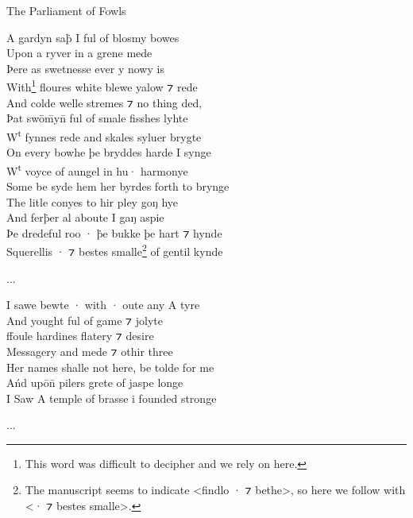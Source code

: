 \begin{texts}{The Parliament of Fowls}
\begin{textglossed}
A gardyn sa\.{þ} I ful of blosmy bowes\\
Upon a ryver in a grene mede\\
Þere as swetnesse ever y nowy is\\
With\footnote{This word was difficult to decipher and we rely on \citet[386--390]{Benson1991} here.} floures white blewe yalow ⁊ rede\\
And colde welle stremes ⁊ no thing ded,\\
Þat swōm̄yn̄ ful of smale fisshes lyhte\\
W\textsuperscript{t} fynnes rede and skales syluer brygte\\
On every bowhe þe bryddes harde I synge\\
W\textsuperscript{t} voyce of aungel in hu· harmonye\\
Some be syde hem her byrdes forth to brynge\\
The litle conyes to hir pley goŋ hye\\
And fer\.{þ}er al aboute I gaŋ aspie\\
Þe dredeful roo · \.{þ}e bukke þe hart ⁊ hynde\\
Squerellis · ⁊ bestes smalle\footnote{The manuscript seems to indicate <findlo · ⁊ bethe>, so here we follow \citet[388]{Benson1991} with <· ⁊ bestes smalle>.} of gentil kynde

...

I sawe bewte · with · oute any A tyre\\
And yought ful of game ⁊ jolyte\\
ffoule hardines flatery ⁊ desire\\
Messagery and mede ⁊ othir three\\
Her names shalle not here, be tolde for me\\
A\'{n}d upōn̄ pilers grete of jaspe longe\\
I Saw A temple of brasse i founded stronge
  
...


\end{textglossed}
\end{texts}
